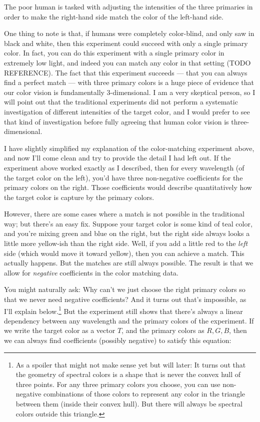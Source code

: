 \documentclass[
]{article}
\begin{document}
The poor human is tasked with adjusting the intensities of the three
primaries in order to make the right-hand side match the color of the
left-hand side.

One thing to note is that, if humans were completely color-blind, and
only saw in black and white, then this experiment could succeed with
only a single primary color. In fact, you can do this experiment with a
single primary color in extremely low light, and indeed you can match
any color in that setting (TODO REFERENCE). The fact that this
experiment succeeds --- that you can always find a perfect match ---
with three primary colors is a huge piece of evidence that our color
vision is fundamentally 3-dimensional. I am a very skeptical person, so
I will point out that the traditional experiments did not perform a
systematic investigation of different intensities of the target color,
and I would prefer to see that kind of investigation before fully
agreeing that human color vision is three-dimensional.

I have slightly simplified my explanation of the color-matching
experiment above, and now I'll come clean and try to provide the detail
I had left out. If the experiment above worked exactly as I described,
then for every wavelength (of the target color on the left), you'd have
three non-negative coefficients for the primary colors on the right.
Those coefficients would describe quantitatively how the target color is
capture by the primary colors.

However, there are some cases where a match is not possible in the
traditional way; but there's an easy fix. Suppose your target color is
some kind of teal color, and you're mixing green and blue on the right,
but the right side always looks a little more yellow-ish than the right
side. Well, if you add a little red to the \emph{left} side (which would
move it toward yellow), then you can achieve a match. This actually
happens. But the matches are still always possible. The result is that
we allow for \emph{negative} coefficients in the color matching data.

You might naturally ask: Why can't we just choose the right primary
colors so that we never need negative coefficients? And it turns out
that's impossible, as I'll explain below.\footnote{As a spoiler that
  might not make sense yet but will later: It turns out that the
  geometry of spectral colors is a shape that is never the convex hull
  of three points. For any three primary colors you choose, you can use
  non-negative combinations of those colors to represent any color in
  the triangle between them (inside their convex hull). But there will
  always be spectral colors outside this triangle.} But the experiment
still shows that there's always a linear dependency between any
wavelength and the primary colors of the experiment. If we write the
target color as a vector \(T\), and the primary colors as \(R, G, B\),
then we can always find coefficients (possibly negative) to satisfy this
equation:
\end{document}
